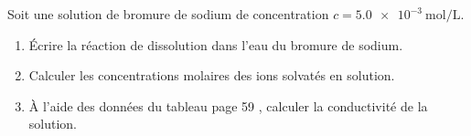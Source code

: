 Soit une solution de bromure de sodium  de concentration
$c=\qty{5.0e-3}{\mol\per\L}$.
\begin{enumerate}
    \item Écrire la réaction de dissolution dans l'eau du bromure de sodium.
    \item Calculer les concentrations molaires des ions solvatés en solution.
    \item À l'aide des données du tableau page 59 , calculer la conductivité de
          la solution.
\end{enumerate}

